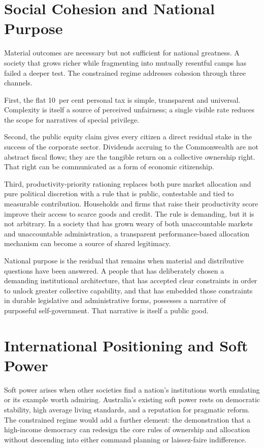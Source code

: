 \documentclass[12pt,anyside]{book}
\theoremstyle{definition}
\theoremstyle{plain}
\theoremstyle{remark}
\begin{document}
\section{Social Cohesion and National Purpose}

Material outcomes are necessary but not sufficient for national greatness. A society that grows richer while fragmenting into mutually resentful camps has failed a deeper test. The constrained regime addresses cohesion through three channels.

First, the flat 10~per cent personal tax is simple, transparent and universal. Complexity is itself a source of perceived unfairness; a single visible rate reduces the scope for narratives of special privilege.

Second, the public equity claim gives every citizen a direct residual stake in the success of the corporate sector. Dividends accruing to the Commonwealth are not abstract fiscal flows; they are the tangible return on a collective ownership right. That right can be communicated as a form of economic citizenship.

Third, productivity-priority rationing replaces both pure market allocation and pure political discretion with a rule that is public, contestable and tied to measurable contribution. Households and firms that raise their productivity score improve their access to scarce goods and credit. The rule is demanding, but it is not arbitrary. In a society that has grown weary of both unaccountable markets and unaccountable administration, a transparent performance-based allocation mechanism can become a source of shared legitimacy.

National purpose is the residual that remains when material and distributive questions have been answered. A people that has deliberately chosen a demanding institutional architecture, that has accepted clear constraints in order to unlock greater collective capability, and that has embedded those constraints in durable legislative and administrative forms, possesses a narrative of purposeful self-government. That narrative is itself a public good.

\section{International Positioning and Soft Power}

Soft power arises when other societies find a nation’s institutions worth emulating or its example worth admiring. Australia’s existing soft power rests on democratic stability, high average living standards, and a reputation for pragmatic reform. The constrained regime would add a further element: the demonstration that a high-income democracy can redesign the core rules of ownership and allocation without descending into either command planning or laissez-faire indifference.
\end{document}
